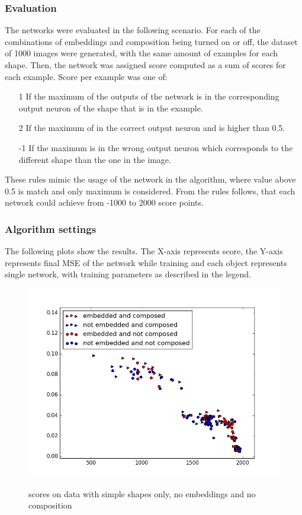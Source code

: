 \subsubsection{Evaluation}
The networks were evaluated in the following scenario. For each of the combinations of embeddings and composition being turned on or off, the dataset of 1000 images were generated, with the same amount of examples for each shape. Then, the network was assigned score computed as a sum of scores for each example. Score per example was one of:

\begin{enumerate}
\item [1] If the maximum of the outputs of the network is in the corresponding output neuron of the shape that is in the example.
\item [2] If the maximum of in the correct output neuron and is higher than 0.5.
\item [-1] If the maximum is in the wrong output neuron which corresponds to the different shape than the one in the image.
\end{enumerate}

These rules mimic the usage of the network in the algorithm, where value above 0.5 is match and only maximum is considered. From the rules follows, that each network could achieve from -1000 to 2000 score points. 

\subsubsection{Algorithm settings}
The following plots show the results. The X-axis represents score, the Y-axis represents final MSE of the network while training and each object represents single network, with training parameters as described in the legend.

\begin{figure}[!htb]
\begin{center}
\label{fig:simples_com}
\includegraphics[width=\linewidth]{ext/figure_simples_com.png}
\end{center}
	\centering
	\caption{scores on data with simple shapes only, no embeddings and no composition}
\end{figure}

